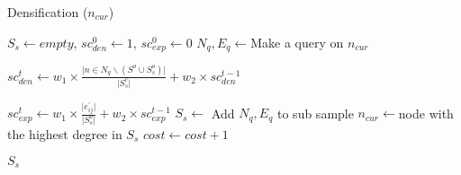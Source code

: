 \begin{algorithm}
\caption{Densification ({$n_{cur}$})}\label{mod}
\begin{algorithmic}[1]
\State $S_{s} \gets empty$, $sc^{0}_{den} \gets 1$, $sc^{0}_{exp} \gets 0$
	\State $N_{q}, E_{q} \gets $Make a query on $n_{cur}$
	
	\State $sc^{t}_{den} \gets w_{1}\times \frac{ \vert n \in N_{q} \backslash (S^{o} \cup S_{s}^{o} ) \vert }{\vert S_{s}^{c} \vert} + w_{2} \times sc^{t-1}_{den}$
	
	
	\State $sc^{t}_{exp} \gets w_{1} \times  \frac{\vert e^{'}_{ij} \vert }{\vert S_{s}^{o} \vert}  + w_{2} \times sc^{t-1}_{exp}$
	\State $S_{s} \gets $ Add $N_{q}, E_{q}$ to sub sample
	\State $n_{cur} \gets $node with the highest degree in $S_{s}$
	\State $cost \gets cost + 1 $
\EndWhile

\Return $S_{s}$
\end{algorithmic}
\end{algorithm}

%	
%

